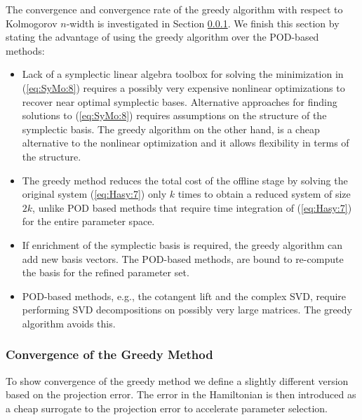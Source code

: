 The convergence and convergence rate of the greedy algorithm with respect to Kolmogorov $n$-width is investigated in Section \ref{chap:SyMo.PrSy:3}. We finish this section by stating the advantage of using the greedy algorithm over the POD-based methods:
\begin{itemize}
\item Lack of a symplectic linear algebra toolbox for solving the minimization in (\ref{eq:SyMo:8}) requires a possibly very expensive nonlinear optimizations to recover near optimal symplectic bases. Alternative approaches for finding solutions to (\ref{eq:SyMo:8}) requires assumptions on the structure of the symplectic basis. The greedy algorithm on the other hand, is a cheap alternative to the nonlinear optimization and it allows flexibility in terms of the structure.
\item The greedy method reduces the total cost of the offline stage by solving the original system (\ref{eq:Hasy:7}) only $k$ times to obtain a reduced system of size $2k$, unlike POD based methods that require time integration of (\ref{eq:Hasy:7}) for the entire parameter space.
\item If enrichment of the symplectic basis is required, the greedy algorithm can add new basis vectors. The POD-based methods, are bound to re-compute the basis for the refined parameter set.
\item POD-based methods, e.g., the cotangent lift and the complex SVD, require performing SVD decompositions on possibly very large matrices. The greedy algorithm avoids this.
\end{itemize}






\subsubsection{Convergence of the Greedy Method} \label{chap:SyMo.PrSy:3}

To show convergence of the greedy method we define a slightly different version based on the projection error. The error in the Hamiltonian is then introduced as a cheap surrogate to the projection error to accelerate parameter selection.

